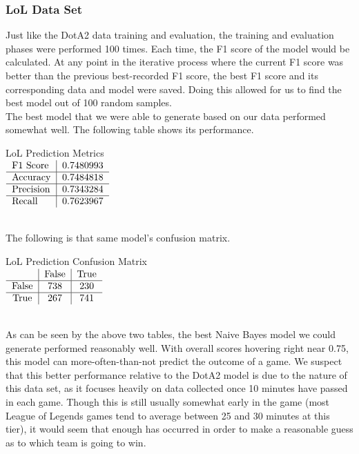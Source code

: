 \documentclass[sigconf]{acmart}
\begin{document}
\subsubsection{LoL Data Set}
Just like the DotA2 data training and evaluation, the training and evaluation phases were performed 100 times. Each time, the F1 score of the model would be calculated. At any point in the iterative process where the current F1 score was better than the previous best-recorded F1 score, the best F1 score and its corresponding data and model were saved. Doing this allowed for us to find the best model out of 100 random samples.\\
The best model that we were able to generate based on our data performed somewhat well. The following table shows its performance.\\
\begin{center}
LoL Prediction Metrics\\
$\begin{tabular}{l|l}
F1 Score & 0.7480993 \\ \hline
Accuracy & 0.7484818 \\ \hline
Precision & 0.7343284 \\ \hline
Recall & 0.7623967 \\
\end{tabular}$
\end{center}\\
The following is that same model's confusion matrix.\\
\begin{center}
LoL Prediction Confusion Matrix\\
$\begin{tabular}{c|c|c}
 & False & True \\ \hline
False & 738 & 230 \\ \hline
True & 267 & 741 \\
\end{tabular}$
\end{center}\\
As can be seen by the above two tables, the best Naive Bayes model we could generate performed reasonably well. With overall scores hovering right near 0.75, this model can more-often-than-not predict the outcome of a game. We suspect that this better performance relative to the DotA2 model is due to the nature of this data set, as it focuses heavily on data collected once 10 minutes have passed in each game. Though this is still usually somewhat early in the game (most League of Legends games tend to average between 25 and 30 minutes at this tier), it would seem that enough has occurred in order to make a reasonable guess as to which team is going to win.
\end{document}
